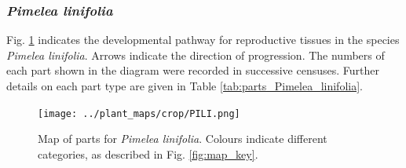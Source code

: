 \documentclass[10pt,twoside]{article}\usepackage[]{graphicx}\usepackage[]{color}
\begin{document}
\clearpage

\subsubsection{\emph{Pimelea linifolia}}

Fig. \ref{fig:map_Pimelea_linifolia} indicates the developmental pathway for reproductive tissues in the species \emph{Pimelea linifolia}. Arrows indicate the direction of progression.  The numbers of each part shown in the diagram were recorded in successive censuses. Further details on each part type are given in Table \ref{tab:parts_Pimelea_linifolia}.

\begin{figure}[h]
\centering
\texttt{[image: ../plant\_maps/crop/PILI.png]}
\caption{Map of parts for \emph{Pimelea linifolia}. Colours indicate different categories, as described in Fig. \ref{fig:map_key}.}
\label{fig:map_Pimelea_linifolia}
\end{figure}

\clearpage
\end{document}

